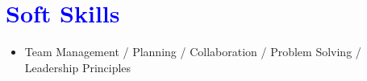 \documentclass[letterpaper,11pt]{article}
\begin{document}
    \section{\textbf{\textcolor{blue}{Soft Skills}}}
    \begin{itemize}
    \item {Team Management / Planning / Collaboration / Problem Solving / Leadership Principles}
\end{itemize}

  
\end{document}
